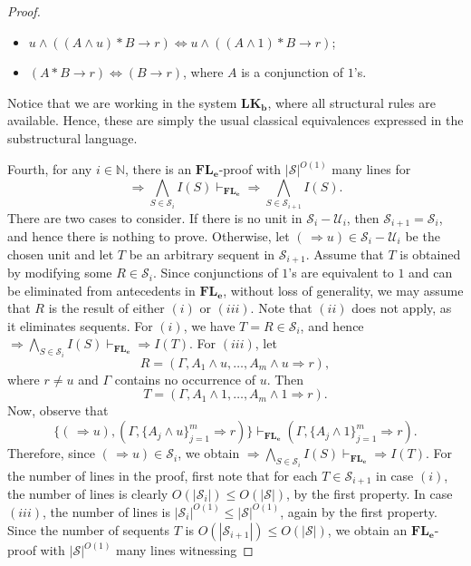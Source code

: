 \documentclass[12pt,a4paper]{article}
\theoremstyle{plain}
\theoremstyle{definition}
\newcommand{\LKb}{\mathbf{LK_b}}
\begin{document}
\begin{proof}
\begin{itemize}
    \item
    $u\wedge((A\wedge u)*B\to r)
    \Leftrightarrow
    u\wedge((A\wedge 1)*B\to r)$;
    
    \item
    $(A*B\to r)\Leftrightarrow(B\to r)$,
    where $A$ is a conjunction of $1$'s.
\end{itemize}
Notice that we are working in the system $\LKb$, where all structural rules
are available. Hence, these are simply the usual classical equivalences
expressed in the substructural language.

Fourth, for any $i\in\mathbb{N}$, there is an $\mathbf{FL_e}$-proof with
$|\mathcal{S}|^{O(1)}$ many lines for
\[
\Rightarrow\bigwedge_{S\in\mathcal{S}_i} I(S)
\vdash_{\mathbf{FL_e}}
\Rightarrow\bigwedge_{S\in\mathcal{S}_{i+1}} I(S).
\]
There are two cases to consider. If there is no unit in
$\mathcal{S}_i-\mathcal{U}_i$, then
$\mathcal{S}_{i+1}=\mathcal{S}_i$, and hence there is nothing to prove.
Otherwise, let $(\,\Rightarrow u)\in\mathcal{S}_i-\mathcal{U}_i$ be the
chosen unit and let $T$ be an arbitrary sequent in $\mathcal{S}_{i+1}$.
Assume that $T$ is obtained by modifying some $R\in\mathcal{S}_i$.
Since conjunctions of $1$'s are equivalent to $1$ and can be eliminated
from antecedents in $\mathbf{FL_e}$, without loss of generality, we may
assume that $R$ is the result of either $(i)$ or $(iii)$. Note that $(ii)$
does not apply, as it eliminates sequents.
For $(i)$, we have $T=R\in\mathcal{S}_i$, and hence
$
\Rightarrow\bigwedge_{S\in\mathcal{S}_i} I(S)
\vdash_{\mathbf{FL_e}}
\Rightarrow I(T).
$
For $(iii)$, let
\[
R=(\Gamma,A_1\wedge u,\ldots,A_m\wedge u\Rightarrow r),
\]
where $r\neq u$ and $\Gamma$ contains no occurrence of $u$. Then
\[
T=(\Gamma,A_1\wedge1,\ldots,A_m\wedge1\Rightarrow r).
\]
Now, observe that
\[
\{(\,\Rightarrow u),
(\Gamma,\{A_j\wedge u\}_{j=1}^m\Rightarrow r)\}
\vdash_{\mathbf{FL_e}}
(\Gamma,\{A_j\wedge1\}_{j=1}^m\Rightarrow r).
\]
Therefore, since $(\,\Rightarrow u)\in\mathcal{S}_i$, we obtain
$
\Rightarrow\bigwedge_{S\in\mathcal{S}_i} I(S)
\vdash_{\mathbf{FL_e}}
\Rightarrow I(T).
$
For the number of lines in the proof, first note that for each
$T\in\mathcal{S}_{i+1}$ in case $(i)$, the number of lines is clearly
$O(|\mathcal{S}_i|)\leq O(|\mathcal{S}|)$, by the first property. In case
$(iii)$, the number of lines is
$|\mathcal{S}_i|^{O(1)}\leq|\mathcal{S}|^{O(1)}$, again by the first
property. Since the number of sequents $T$ is
$O(|\mathcal{S}_{i+1}|)\leq O(|\mathcal{S}|)$, we obtain an
$\mathbf{FL_e}$-proof with $|\mathcal{S}|^{O(1)}$ many lines witnessing

\end{proof}
\end{document}

